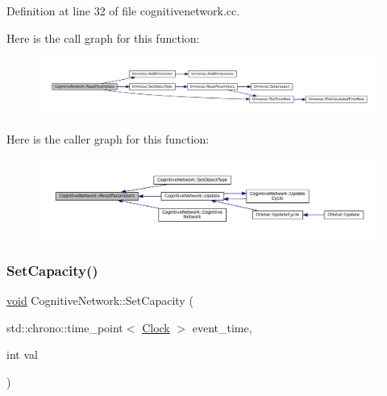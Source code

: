 Definition at line 32 of file cognitivenetwork.\+cc.

Here is the call graph for this function\+:\nopagebreak
\begin{figure}[H]
\begin{center}
\leavevmode
\includegraphics[width=350pt]{class_cognitive_network_a8af8ed2605263e57a32e457aba2af99d_cgraph}
\end{center}
\end{figure}
Here is the caller graph for this function\+:\nopagebreak
\begin{figure}[H]
\begin{center}
\leavevmode
\includegraphics[width=350pt]{class_cognitive_network_a8af8ed2605263e57a32e457aba2af99d_icgraph}
\end{center}
\end{figure}
\mbox{\label{class_cognitive_network_a055b3711835b8d134356298f8975f04d}} 
\subsubsection{\texorpdfstring{Set\+Capacity()}{SetCapacity()}}
{\footnotesize\ttfamily \mbox{\hyperlink{glad_8h_a950fc91edb4504f62f1c577bf4727c29}{void}} Cognitive\+Network\+::\+Set\+Capacity (\begin{DoxyParamCaption}\item[{std\+::chrono\+::time\+\_\+point$<$ \mbox{\hyperlink{universe_8h_a0ef8d951d1ca5ab3cfaf7ab4c7a6fd80}{Clock}} $>$}]{event\+\_\+time,  }\item[{int}]{val }\end{DoxyParamCaption})\hspace{0.3cm}{\ttfamily [inline]}}



